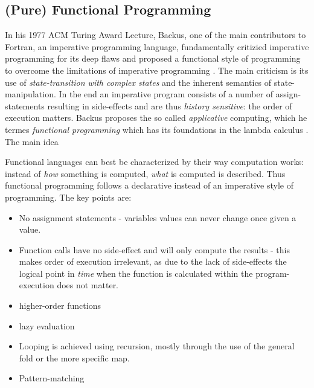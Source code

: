 \subsection{(Pure) Functional Programming}
In his 1977 ACM Turing Award Lecture, Backus, one of the main contributors to Fortran, an imperative programming language, fundamentally critizied imperative programming for its deep flaws and proposed a functional style of programming to overcome the limitations of imperative programming \cite{backus_can_1978}. The main criticism is its use of \textit{state-transition with complex states} and the inherent semantics of state-manipulation. In the end an imperative program consists of a number of assign-statements resulting in side-effects and are thus \textit{history sensitive}: the order of execution matters.
Backus proposes the so called \textit{applicative} computing, which he termes \textit{functional programming} which has its foundations in the lambda calculus \cite{church_calculi_1941}. The main idea 

Functional languages can best be characterized by their way computation works: instead of \textit{how} something is computed, \textit{what} is computed is described. Thus functional programming follows a declarative instead of an imperative style of programming. The key points are:
\begin{itemize}
\item No assignment statements - variables values can never change once given a value.
\item Function calls have no side-effect and will only compute the results - this makes order of execution irrelevant, as due to the lack of side-effects the logical point in \textit{time} when the function is calculated within the program-execution does not matter.
\item higher-order functions
\item lazy evaluation
\item Looping is achieved using recursion, mostly through the use of the general fold or the more specific map.
\item Pattern-matching
\end{itemize}

